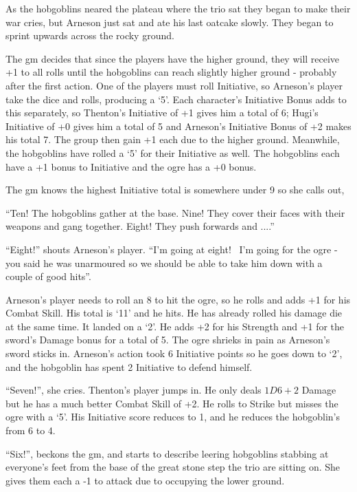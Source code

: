 \begin{multicols}{2}
{\begin{exampletext}
	As the hobgoblins neared the plateau where the trio sat they began to make their war cries, but Arneson just sat and ate his last oatcake slowly. They began to sprint upwards across the rocky ground.

	The \gls{gm} decides that since the players have the higher ground, they will receive +1 to all rolls until the hobgoblins can reach slightly higher ground - probably after the first action.
One of the players must roll Initiative, so Arneson's player take the dice and rolls, producing a `5'.
Each character's Initiative Bonus adds to this separately, so Thenton's Initiative of +1 gives him a total of 6; Hugi's Initiative of +0 gives him a total of 5 and Arneson's Initiative Bonus of +2 makes his total 7.
The group then gain +1 each due to the higher ground.
Meanwhile, the hobgoblins have rolled a `5' for their Initiative as well.
The hobgoblins each have a +1 bonus to Initiative and the ogre has a +0 bonus.

	The \gls{gm} knows the highest Initiative total is somewhere under 9 so she calls out,

	``Ten! The hobgoblins gather at the base. Nine! They cover their faces with their weapons and gang together. Eight! They push forwards and ....''

	``Eight!'' shouts Arneson's player. ``I'm going at eight! \ I'm going for the ogre - you said he was unarmoured so we should be able to take him down with a couple of good hits''.


	Arneson's player needs to roll an 8 to hit the ogre, so he rolls and adds +1 for his Combat Skill. His total is `11' and he hits. He has already rolled his damage die at the same time. It landed on a `2'. He adds +2 for his Strength and +1 for the sword's Damage bonus for a total of 5. The ogre shrieks in pain as Arneson's sword sticks in. Arneson's action took 6 Initiative points so he goes down to `2', and the hobgoblin has spent 2 Initiative to defend himself.

	``Seven!'', she cries. Thenton's player jumps in. He only deals $1D6+2$ Damage but he has a much better Combat Skill of +2. He rolls to Strike but misses the ogre with a `5'. His Initiative score reduces to 1, and he reduces the hobgoblin's from 6 to 4.

	``Six!'', beckons the \gls{gm}, and starts to describe leering hobgoblins stabbing at everyone's feet from the base of the great stone step the trio are sitting on. She gives them each a -1 to attack due to occupying the lower ground.


\end{exampletext}}
\end{multicols}
